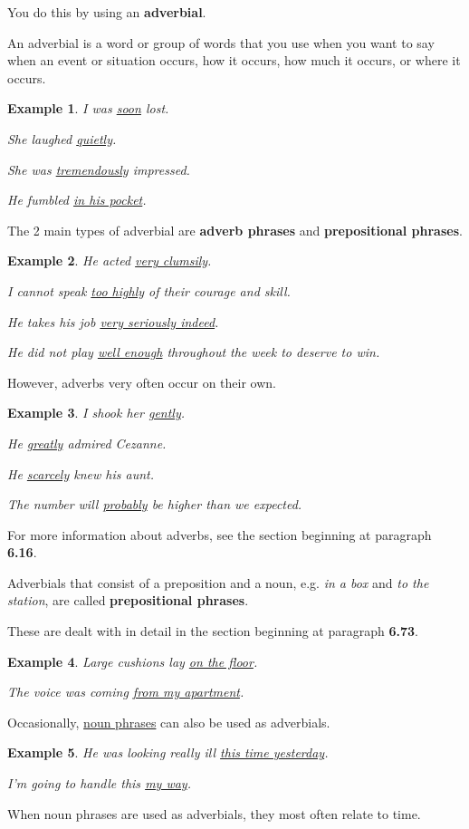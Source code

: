 \documentclass[oneside]{book}
\numberwithin{equation}{section}
\newtheorem{example}{Example}[section]
\begin{document}
You do this by using an \textbf{adverbial}.

%
An adverbial is a word or group of words that you use when you want to say when an event or situation occurs, how it occurs, how much it occurs, or where it occurs.
\begin{example}
    I was \underline{soon} lost.
    
    She laughed \underline{quietly}.
    
    She was \underline{tremendously} impressed.
    
    He fumbled \underline{in his pocket}.
\end{example}
%
\noindent{} The 2 main types of adverbial are \textbf{adverb phrases} and \textbf{prepositional phrases}.
\begin{example}
    He acted \underline{very clumsily}.
    
    I cannot speak \underline{too highly} of their courage and skill.
    
    He takes his job \underline{very seriously indeed}.
    
    He did not play \underline{well enough} throughout the week to deserve to win.
\end{example}
However, adverbs very often occur on their own.
\begin{example}
    I shook her \underline{gently}.
    
    He \underline{greatly} admired Cezanne.
    
    He \underline{scarcely} knew his aunt.
    
    The number will \underline{probably} be higher than we expected.
\end{example}
For more information about adverbs, see the section beginning at paragraph \textbf{6.16}.

%
\noindent{} Adverbials that consist of a preposition and a noun, e.g. \textit{in a box} and \textit{to the station}, are called \textbf{prepositional phrases}.

These are dealt with in detail in the section beginning at paragraph \textbf{6.73}.
\begin{example}
    Large cushions lay \underline{on the floor}.
    
    The voice was coming \underline{from my apartment}.
\end{example}
%
\noindent{} Occasionally, \underline{noun phrases} can also be used as adverbials.
\begin{example}
    He was looking really ill \underline{this time yesterday}.
    
    I'm going to handle this \underline{my way}.
\end{example}
When noun phrases are used as adverbials, they most often relate to time.
\end{document}
